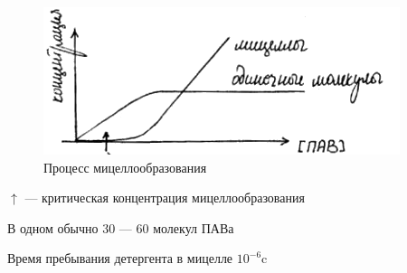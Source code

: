 \begin{lecture}
	\begin{lecSection}	
	\begin{figure}
    	\begin{center}
			\includegraphics[width=\linewidth]{lecture_07/new_pic9}
     	\end{center}
     \caption{Процесс мицеллообразования}
	\end{figure}
	\par $\uparrow$ --- критическая концентрация мицеллообразования
	\par В одном обычно 30 --- 60 молекул ПАВа
	\par Время пребывания детергента в мицелле $10^{-6} \text{c}$
	
	\end{lecSection}
		
\end{lecture}

